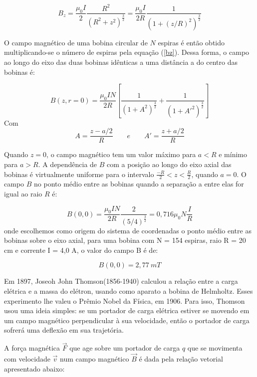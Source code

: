 \documentclass{article}
\begin{document}
\begin{equation}
    \label{bz}
    B _z = \frac{\mu _0 I}{2}\frac{R^2}{(R^2 + z^2)^{\frac{3}{2}}} =  \frac{\mu _0 I}{2R}\frac{1}{(1 + (z/R)^2)^{\frac{3}{2}}}
\end{equation}

O campo magnético de uma bobina circular de $N$ espiras é então obtido multiplicando-se o número de espiras pela equação (\ref{bz}). Dessa forma, o campo ao longo do eixo das duas bobinas idênticas a uma distância a do centro das bobinas é:

\begin{equation}
    \label{bzn}
    B(z,r=0) =  \frac{\mu _0 I N}{2R} \left [ \frac{1}{(1 + A^2)^{\frac{3}{2}}} + \frac{1}{(1 + A'^2)^{\frac{3}{2}}} \right ]
\end{equation}
Com
\begin{equation*}
    A = \frac{z-a/2}{R} \qquad e \qquad A' = \frac{z+a/2}{R}     
\end{equation*}

Quando  $z = 0$, o campo magnético tem um valor máximo para $a < R$ e mínimo para $a > R$. A dependência de $B$ com a posição ao longo do eixo axial das bobinas é virtualmente uniforme para o intervalo $\frac{-R}{2} < z < \frac{R}{2}$, quando $a = 0$. O campo $B$ no ponto médio entre as bobinas quando a separação a entre elas for igual ao raio $R$ é:

\begin{equation}
    \label{b0}
    B(0,0) = \frac{\mu _0 I N }{2R} \frac{2}{(5/4)^{\frac{3}{2}}} = 0,716 \mu _0 N \frac{I}{R}
\end{equation}
onde escolhemos como origem do sistema de coordenadas o ponto médio entre as bobinas sobre o eixo axial, para uma bobina com N = 154 espiras, raio R = 20 cm e corrente I = 4,0 A, o valor do campo B é de:

\begin{equation}
    B(0,0) = 2,77 \ mT
\end{equation}

Em 1897, Joseoh John Thomson(1856-1940) calculou a relação entre a carga elétrica e a massa do elétron, usando como aparato a bobina de Helmholtz. Esses experimento lhe valeu o Prêmio Nobel da Física, em 1906. Para isso, Thomson usou uma ideia simples: se um portador de carga elétrica estiver se movendo em um campo magnético perpendicular à sua velocidade, então o portador de carga sofrerá uma deflexão em sua trajetória.

A força magnética $\vec F$  que age sobre um portador de carga $q$ que se movimenta com velocidade $\vec v$ num campo magnético $\vec B$ é dada pela relação vetorial apresentado abaixo:
\end{document}
